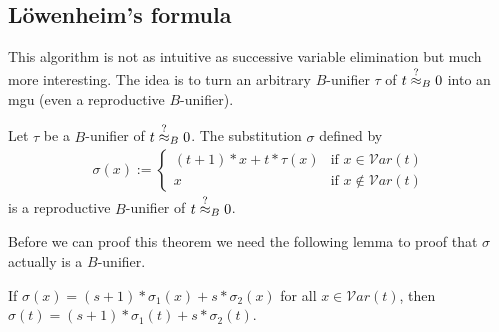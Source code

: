 		\subsection{Löwenheim's formula}
		This algorithm is not as intuitive as successive variable elimination but much more interesting. The idea is to turn an arbitrary $B$-unifier $\tau$ of $t\stackrel{?}{\approx}_B0$ into an mgu (even a reproductive $B$-unifier).
		\begin{theorem}\label{lowenheim}
		Let $\tau$ be a $B$-unifier of $t\stackrel{?}{\approx}_B0$. The substitution $\sigma$ defined by
		\begin{align*}
		\sigma(x):=\begin{cases}
		(t+1)*x+t*\tau(x) &\text{if }x\in\mathcal{V}ar(t) \\
		x &\text{if }x\notin\mathcal{V}ar(t)
		\end{cases}
		\end{align*}
		is a reproductive $B$-unifier of $t\stackrel{?}{\approx}_B0$.
		\end{theorem}
		Before we can proof this theorem we need the following lemma to proof that $\sigma$ actually is a $B$-unifier. 
		\begin{lemma}\label{lowenLemma}
		If $\sigma(x)=(s+1)*\sigma_1(x)+s*\sigma_2(x)$ for all $x\in\mathcal{V}ar(t)$, then $\sigma(t)=(s+1)*\sigma_1(t)+s*\sigma_2(t)$.
		\end{lemma}
